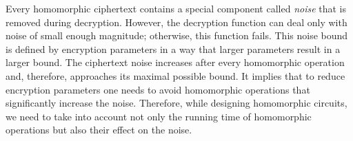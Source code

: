 


Every homomorphic ciphertext contains a special component called \emph{noise} that is removed during decryption.
However, the decryption function can deal only with noise of small enough magnitude; otherwise, this function fails.
This noise bound is defined by encryption parameters in a way that larger parameters result in a larger bound.
The ciphertext noise increases after every homomorphic operation and, therefore, approaches its maximal possible bound.
It implies that to reduce encryption parameters one needs to avoid homomorphic operations that significantly increase the noise.
Therefore, while designing homomorphic circuits, we need to take into account not only the running time of homomorphic operations but also their effect on the noise.  

